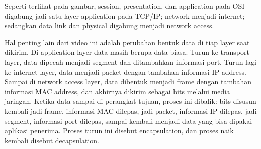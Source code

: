 \documentclass[11pt]{article}
\begin{document}
\begin{center}
\end{center}

Seperti terlihat pada gambar, session, presentation, dan application pada OSI digabung jadi satu layer application pada TCP/IP; network menjadi internet; sedangkan data link dan physical digabung menjadi network access.

Hal penting lain dari video ini adalah perubahan bentuk data di tiap layer saat dikirim. Di application layer data masih berupa data biasa. Turun ke transport layer, data dipecah menjadi segment dan ditambahkan informasi port. Turun lagi ke internet layer, data menjadi packet dengan tambahan informasi IP address. Sampai di network access layer, data dibentuk menjadi frame dengan tambahan informasi MAC address, dan akhirnya dikirim sebagai bits melalui media jaringan. Ketika data sampai di perangkat tujuan, proses ini dibalik: bits disusun kembali jadi frame, informasi MAC dilepas, jadi packet, informasi IP dilepas, jadi segment, informasi port dilepas, sampai kembali menjadi data yang bisa dipakai aplikasi penerima. Proses turun ini disebut encapsulation, dan proses naik kembali disebut decapsulation.
\end{document}
